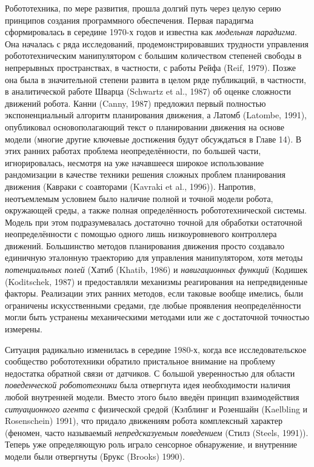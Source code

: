 \documentclass[10pt,a4paper]{article}
\begin{document}
Робототехника, по мере развития, прошла долгий путь через целую серию принципов создания программного обеспечения. Первая парадигма сформировалась в середине 1970-х годов и известна как \textit{модельная парадигма}. Она началась с ряда исследований, продемонстрировавших трудности управления робототехническим манипулятором с большим количеством степеней свободы в непрерывных пространствах, в частности, с работы Рейфа (Reif, 1979). Позже она была в значительной степени развита в целом ряде публикаций, в частности, в аналитической работе Шварца (Schwartz et al., 1987) об оценке сложности движений робота. Канни (Canny, 1987) предложил первый полностью экспоненциальный алгоритм планирования движения, а Латомб (Latombe, 1991), опубликовал основополагающий текст о планировании движения на основе модели (многие другие ключевые достижения будут обсуждаться в Главе 14). В этих ранних работах проблема неопределённости, по большей части, игнорировалась, несмотря на уже начавшееся широкое использование рандомизации в качестве техники решения сложных проблем планирования движения (Кавраки с соавторами (Kavraki et al., 1996)). Напротив, неотъемлемым условием было наличие полной и точной модели робота, окружающей среды, а также полная определённость робототехнической системы. Модель при этом подразумевалась достаточно точной для обработки остаточной неопределённости с помощью одного лишь низкоуровневого контроллера движений. Большинство методов планирования движения просто создавало единичную эталонную траекторию для управления манипулятором, хотя методы \textit{потенциальных полей} (Хатиб (Khatib, 1986) и \textit{навигационных функций} (Кодишек (Koditschek, 1987) и предоставляли механизмы реагирования на непредвиденные факторы. Реализации этих ранних методов, если таковые вообще имелись, были ограничены искусственными средами, где любые проявления неопределённости могли быть устранены механическими методами или же с достаточной точностью измерены.
 
Ситуация радикально изменилась в середине 1980-х, когда все исследовательское сообщество робототехники обратило пристальное внимание на проблему недостатка обратной связи от датчиков. С большой уверенностью  для области \textit{поведенческой робототехники} была отвергнута идея необходимости наличия любой внутренней модели. Вместо этого было введён принцип взаимодействия \textit{ситуационного агента} с физической средой (Кэлблинг и Розеншайн (Kaelbling и Rosenschein) 1991), что  придало движениям робота комплексный характер (феномен, часто называемый \textit{непредсказуемым поведением} (Стилз (Steels, 1991)). Теперь уже определяющую роль играло сенсорное обнаружение, и внутренние модели были отвергнуты (Брукс (Brooks) 1990).
\end{document}
